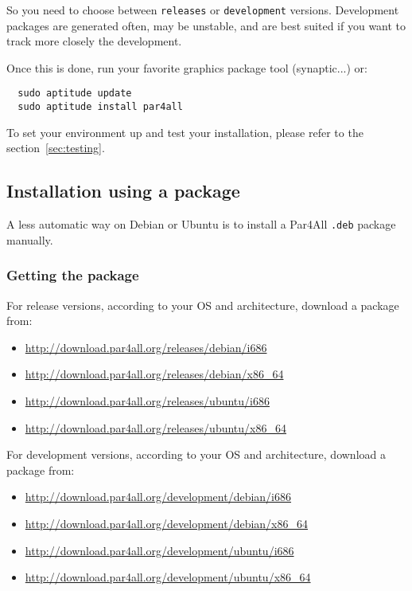 \documentclass[a4paper]{article}
\begin{document}
So you need to choose between \texttt{releases} or \texttt{development}
versions. Development packages are generated often, may be unstable, and
are best suited if you want to track more closely the \Apfa development.

Once this is done, run your favorite graphics package tool
(synaptic...) or:
\begin{verbatim}
  sudo aptitude update
  sudo aptitude install par4all
\end{verbatim}

To set your environment up and test your \Apfa
installation, please refer to the section~\ref{sec:testing}.


\subsection{Installation using a package}

A less automatic way on Debian or Ubuntu is to install a Par4All
\texttt{.deb} package manually.

\subsubsection{Getting the package}

For release versions, according to your OS and architecture, download a package from:
\begin{itemize}
\item \url{http://download.par4all.org/releases/debian/i686}
\item \url{http://download.par4all.org/releases/debian/x86_64}
\item \url{http://download.par4all.org/releases/ubuntu/i686}
\item \url{http://download.par4all.org/releases/ubuntu/x86_64}
\end{itemize}


For development versions, according to your OS and architecture, download a package from:
\begin{itemize}
\item \url{http://download.par4all.org/development/debian/i686}
\item \url{http://download.par4all.org/development/debian/x86_64}
\item \url{http://download.par4all.org/development/ubuntu/i686}
\item \url{http://download.par4all.org/development/ubuntu/x86_64}
\end{itemize}
\end{document}
